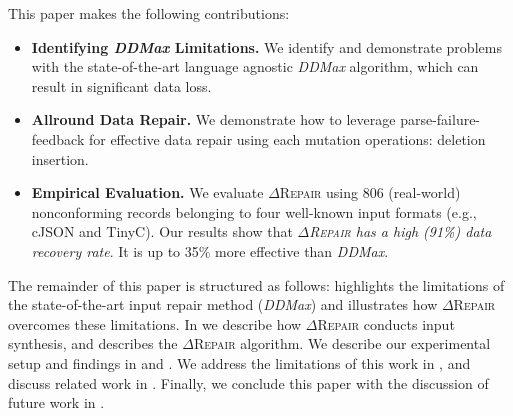 \documentclass[acmsmall,screen,review,anonymous]{acmart}
\newcommand{\approach}{\textsc{$\Delta$Repair}\xspace}
\newcommand{\ddmax}{\textit{DDMax}\xspace}
\begin{document}
This paper makes the following
contributions:
\begin{itemize}
\item \textbf{Identifying \ddmax Limitations.} We identify and demonstrate problems with
the state-of-the-art language agnostic \ddmax algorithm, which can result in
significant data loss.
\item \textbf{Allround Data Repair.} We demonstrate how to leverage
parse-failure-feedback 
for effective data repair using each mutation operations: deletion insertion.

\item \textbf{Empirical Evaluation.} We evaluate \approach using 806 (real-world) nonconforming
records belonging to four well-known input formats (e.g., cJSON and TinyC). 
Our results show that
\textit{\approach has a high (91\%) data recovery rate}. 
It is up to 35\% more effective than \ddmax.

\end{itemize}

The remainder of this paper is structured as follows:  highlights the limitations of the state-of-the-art input repair method (\ddmax) and illustrates how \approach overcomes these limitations. In  we describe how \approach conducts input synthesis, and   describes the \approach algorithm. We describe our experimental setup and findings in  and . We address the limitations %
of this work in , and discuss related work in . Finally, we conclude this paper 
with the discussion of future work in . 
\end{document}
